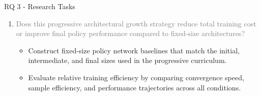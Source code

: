 \begin{frame}{RQ 3 - Research Tasks}
    \begin{enumerate}
        \item[RQ 3] \textcolor{gray}{
            Does this progressive architectural growth strategy reduce total training cost 
            or improve final policy performance compared to fixed-size architectures? }
            \vspace{1em}
    \begin{itemize}
        \item[RT 3.1] {
            Construct fixed-size policy network baselines that match the initial, 
            intermediate, and final sizes used in the progressive curriculum.}
        \item[RT 3.2] {
            Evaluate relative training efficiency by comparing convergence speed, 
            sample efficiency, and performance trajectories across all conditions.}
    \end{itemize}
    \end{enumerate}
\end{frame}

